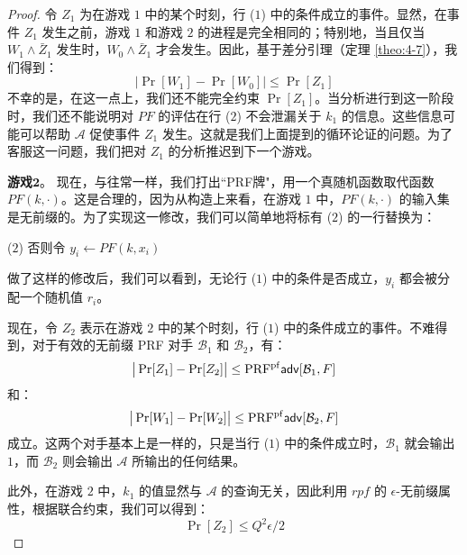 \begin{proof}
\vspace{5pt}

\noindent
令 $Z_1$ 为在游戏 $1$ 中的某个时刻，行 ($1$) 中的条件成立的事件。显然，在事件 $Z_1$ 发生之前，游戏 $1$ 和游戏 $2$ 的进程是完全相同的；特别地，当且仅当 $W_1\land\bar{Z}_1$ 发生时，$W_0\land\bar{Z}_1$ 才会发生。因此，基于差分引理（定理 \ref{theo:4-7}），我们得到：
\begin{equation}\label{eq:6-23}
\big\lvert\Pr[W_1]-\Pr[W_0]\big\rvert\leq\Pr[Z_1]
\end{equation}
不幸的是，在这一点上，我们还不能完全约束 $\Pr[Z_1]$。当分析进行到这一阶段时，我们还不能说明对 $PF$ 的评估在行 ($2$) 不会泄漏关于 $k_1$ 的信息。这些信息可能可以帮助 $\mathcal{A}$ 促使事件 $Z_1$ 发生。这就是我们上面提到的循环论证的问题。为了客服这一问题，我们把对 $Z_1$ 的分析推迟到下一个游戏。

\vspace{5pt}

\noindent\textbf{游戏$\mathbf{2}$}。
现在，与往常一样，我们打出``PRF牌"，用一个真随机函数取代函数 $PF(k,\cdot)$。这是合理的，因为从构造上来看，在游戏 $1$ 中，$PF(k,\cdot)$ 的输入集是无前缀的。为了实现这一修改，我们可以简单地将标有 ($2$) 的一行替换为：

\vspace{5pt}

\hspace*{-19pt} ($2$)
\hspace*{53.5pt} 否则令 $y_i\leftarrow PF(k,x_i)$

\vspace{5pt}

\noindent
做了这样的修改后，我们可以看到，无论行 ($1$) 中的条件是否成立，$y_i$ 都会被分配一个随机值 $r_i$。

现在，令 $Z_2$ 表示在游戏 $2$ 中的某个时刻，行 ($1$) 中的条件成立的事件。不难得到，对于有效的无前缀 PRF 对手 $\mathcal{B}_1$ 和 $\mathcal{B}_2$，有：
\begin{equation}\label{eq:6-24}
\big\lvert\Pr[Z_1]-\Pr[Z_2]\big\rvert\leq{\rm PRF^{pf}}\mathsf{adv}[\mathcal{B}_1,F]
\end{equation}
和：
\begin{equation}\label{eq:6-25}
\big\lvert\Pr[W_1]-\Pr[W_2]\big\rvert\leq{\rm PRF^{pf}}\mathsf{adv}[\mathcal{B}_2,F]
\end{equation}
成立。这两个对手基本上是一样的，只是当行 ($1$) 中的条件成立时，$\mathcal{B}_1$ 就会输出 $1$，而 $\mathcal{B}_2$ 则会输出 $\mathcal{A}$ 所输出的任何结果。

此外，在游戏 $2$ 中，$k_1$ 的值显然与 $\mathcal{A}$ 的查询无关，因此利用 $rpf$ 的 $\epsilon$-无前缀属性，根据联合约束，我们可以得到：
\begin{equation}\label{eq:6-26}
\Pr[Z_2]\leq{Q^2\epsilon}/{2}
\end{equation}


\end{proof}
